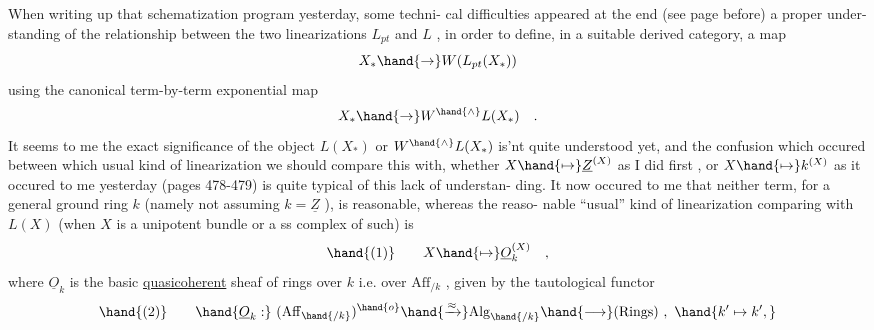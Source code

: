 When writing up that schematization program yesterday,  some techni-%
cal difficulties appeared at the end (see page before)  a proper under-%
standing of the relationship between the two linearizations $L_{pt}$ and $L$ ,
 in order to define,  in a suitable derived category,  a map
\[ X_{*}\hand{\to} W(L_{pt}(X_{*})) \]
using the canonical term-by-term  exponential map
\[ X_{*}\hand{\to} W^{\hand{\wedge}}L(X_{*}) \quad . \]
It seems to me  the exact significance of the object $L(X_{*})$ or 
$W^{\hand{\wedge}}L(X_{*})$ is'nt quite understood yet,  and  the confusion which occured
between which usual kind of linearization we should compare this with,
whether  $X\hand{\mapsto} \underline{Z}^{(X)}$  as I did first ,  or  $X\hand{\mapsto} k^{(X)}$  as it occured to me
yesterday (pages 478-479)\hand{,} is quite typical of this lack of understan-%
ding.  It now occured to me that neither term,  for a general ground
ring $k$ (namely not assuming $k=\underline{Z}$ ),  is reasonable,  whereas the reaso-%
nable ``usual'' kind of linearization comparing with $L(X)$ 
(when $X$ is a unipotent bundle or a ss complex of such)  is
\[ \hand{(1)} \qquad X\hand{\mapsto} \underline{O}_{k}^{(X)} \quad , \]
where $\underline{O}_{k}$  is the basic \uline{quasicoherent}  sheaf of rings over $k$  i.e. over
$\mathrm{Aff}_{/k}$ ,  given by the tautological functor
\[ \hand{(2)} \qquad \hand{\underline{O}_{k}:}\ (\mathrm{Aff}_{\hand{/k}})^{\hand{o}} \hand{\xrightarrow{\approx}} \mathrm{Alg}_{\hand{/k}} \hand{\longrightarrow} (\mathrm{Rings}) \ , \ \hand{k'\mapsto k',} \]

